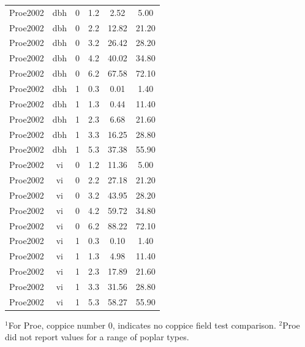 \documentclass[10pt]{article}
\begin{document}
\begin{table}
\begin{tabular}{|l|c|c|c|c|c|}
Proe2002 & dbh & 0 & 1.2 & 2.52 & 5.00\\
Proe2002 & dbh & 0 & 2.2 & 12.82 & 21.20\\
Proe2002 & dbh & 0 & 3.2 & 26.42 & 28.20\\
Proe2002 & dbh & 0 & 4.2 & 40.02 & 34.80\\
Proe2002 & dbh & 0 & 6.2 & 67.58 & 72.10\\
Proe2002 & dbh & 1 & 0.3 & 0.01 & 1.40\\
Proe2002 & dbh & 1 & 1.3 & 0.44 & 11.40\\
Proe2002 & dbh & 1 & 2.3 & 6.68 & 21.60\\
Proe2002 & dbh & 1 & 3.3 & 16.25 & 28.80\\
Proe2002 & dbh & 1 & 5.3 & 37.38 & 55.90\\
Proe2002 & vi & 0 & 1.2 & 11.36 & 5.00\\
Proe2002 & vi & 0 & 2.2 & 27.18 & 21.20\\
Proe2002 & vi & 0 & 3.2 & 43.95 & 28.20\\
Proe2002 & vi & 0 & 4.2 & 59.72 & 34.80\\
Proe2002 & vi & 0 & 6.2 & 88.22 & 72.10\\
Proe2002 & vi & 1 & 0.3 & 0.10 & 1.40\\
Proe2002 & vi & 1 & 1.3 & 4.98 & 11.40\\
Proe2002 & vi & 1 & 2.3 & 17.89 & 21.60\\
Proe2002 & vi & 1 & 3.3 & 31.56 & 28.80\\
Proe2002 & vi & 1 & 5.3 & 58.27 & 55.90\\
\hline
\end{tabular}
\begin{flushleft}
$^1$For Proe, coppice number 0, indicates no coppice field test comparison.
$^2$Proe did not report values for a range of poplar types.
\end{flushleft}
\label{tab:field-summary}
\end{table}
\end{document}
